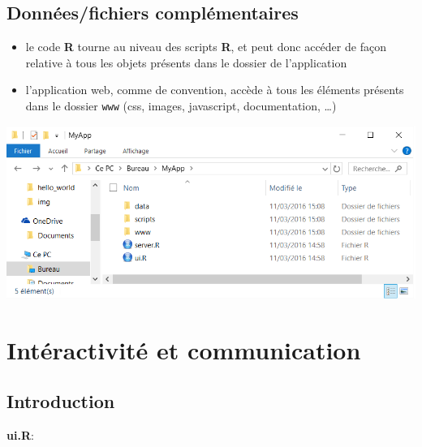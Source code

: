 \documentclass[]{article}
\providecommand{\tightlist}{%
  \setlength{\itemsep}{0pt}\setlength{\parskip}{0pt}}
\begin{document}
\subsection{Données/fichiers
complémentaires}\label{donneesfichiers-complementaires}

\begin{itemize}
\tightlist
\item
  le code \textbf{R} tourne au niveau des scripts \textbf{R}, et peut
  donc accéder de façon relative à tous les objets présents dans le
  dossier de l'application
\item
  l'application web, comme de convention, accède à tous les éléments
  présents dans le dossier \texttt{www} (css, images, javascript,
  documentation, \ldots{})
\end{itemize}

\includegraphics{img/more_apps.png}

\section{Intéractivité et
communication}\label{interactivite-et-communication}

\subsection{Introduction}\label{introduction}

\textbf{ui.R}:
\end{document}
